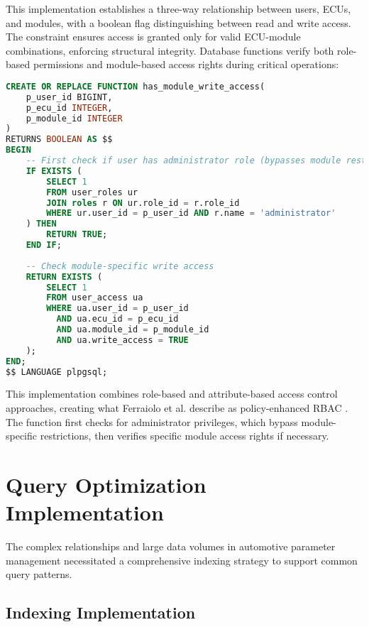 This implementation establishes a three-way relationship between users, ECUs, and modules, with a boolean flag distinguishing between read and write access. The constraint ensures access is granted only for valid ECU-module combinations, enforcing structural integrity. Database functions verify both role-based permissions and module-based access rights during critical operations:

\begin{lstlisting}[language=SQL, caption={Module Access Check Implementation}, label={lst:module-access-check}]
CREATE OR REPLACE FUNCTION has_module_write_access(
    p_user_id BIGINT,
    p_ecu_id INTEGER,
    p_module_id INTEGER
)
RETURNS BOOLEAN AS $$
BEGIN
    -- First check if user has administrator role (bypasses module restrictions)
    IF EXISTS (
        SELECT 1
        FROM user_roles ur
        JOIN roles r ON ur.role_id = r.role_id
        WHERE ur.user_id = p_user_id AND r.name = 'administrator'
    ) THEN
        RETURN TRUE;
    END IF;
    
    -- Check module-specific write access
    RETURN EXISTS (
        SELECT 1
        FROM user_access ua
        WHERE ua.user_id = p_user_id
          AND ua.ecu_id = p_ecu_id
          AND ua.module_id = p_module_id
          AND ua.write_access = TRUE
    );
END;
$$ LANGUAGE plpgsql;
\end{lstlisting}

This implementation combines role-based and attribute-based access control approaches, creating what Ferraiolo et al. describe as policy-enhanced RBAC \cite{ferraiolo2011policy}. The function first checks for administrator privileges, which bypass module-specific restrictions, then verifies specific module access rights if necessary.

\section{Query Optimization Implementation}
\label{sec:query-optimization-implementation}

The complex relationships and large data volumes in automotive parameter management necessitated a comprehensive indexing strategy to support common query patterns.

\subsection{Indexing Implementation}
\label{subsec:indexing-implementation}

